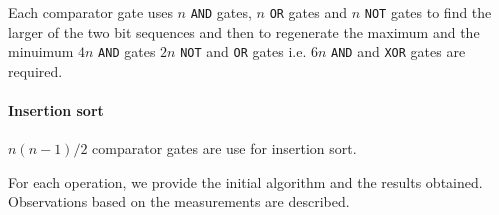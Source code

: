 \documentclass{acm_proc_article-sp}
\begin{document}
Each comparator gate uses $n$ \texttt{AND} gates, $n$ \texttt{OR} gates and $n$ \texttt{NOT} gates to find the larger of the two bit sequences and then to regenerate the maximum and the minuimum $4n$ \texttt{AND} gates $2n$ \texttt{NOT} and \texttt{OR} gates i.e. $6n$ \texttt{AND} and \texttt{XOR} gates are required.  

\paragraph{Insertion sort} $n(n-1)/2$ comparator gates are use for insertion sort.

For each operation, we provide the initial algorithm and the results obtained. Observations based on the measurements are described. 
\\\\\\\\\\\\\\\\\\\\\\\\\\\\\\\\\\\\\\\\\\\\\\\\\\\\\\\\\\\\\\\\\\\\\\\\\\\\\\\\\\\\\\\\\\\\\\\\\\\\\\\\\\\\\\\\\\\\\\\\\\\\\\\\\\\\\\\\\\\\\\\\\\\\\\\\\\\\\\\\\\\\\\\\\\\\\\\\\\\\\\\\\\\\\\\\\\\\\\\\\\\\\\\\\\\\\\\\\\\\\\\\\\\\\\\\\\\\\\\\\\\\\\\\\\\\\\\\\\\\\\\\\\\\\\\\\\\\\\\\\\\\\\\\\\\\\\\\\\\\\\\\\\\\\\\\\\\\\\\\\\\\\\\\\\\\\\\\\\\\\\\\\\\\\\\\\\\\\\\\\\\\\\\\\\\\\\\\\\\\\\\\\\\\\\\\\\\\\\\\\\\\\\\\\\\\\\\\\\\\\\\

\section{Analysis of the results}

Trade-off analysis on the results obtained. Comparison with other protocols in terms of gain with security-cost trade-off. Observations and recommendations on the cost and security trade-off.\\\\\\\\\\\\\\\\\\\\\\\\\\\\\\\\\\\\\\\\\\\\\\\\\\\\\\\\\\\\\\\\\\\\\\\\\\\\\\\\\\\\\\\\\\\\\\\\\\\\\\\\\\\\\\\\\\\\\\\\\\\\\\\\\\\\\\\\\\\\\\\\\\\\\\\\\\\\\\\\\\\\\\\\\\\\\\\\\\\\\\\\\\\\\\\\\\\\\\\\\\\\\\\\\\\
\section{Conclusion}
Conclusion\\\\\\\\\\\\\\\\\\\\\\\\\\\\\\\\\\\\\\\\\\\\\\\\\\\\\\\\\\\\\

\end{document}
